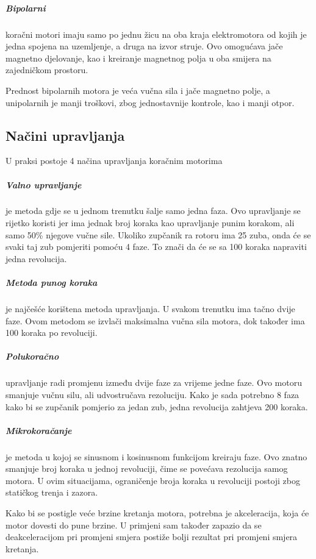 \documentclass[../Document.tex]{subfiles}
\begin{document}

\subparagraph{Bipolarni} \noindent koračni motori imaju samo po jednu žicu na oba kraja elektromotora od kojih je jedna spojena na uzemljenje, a druga na izvor struje. Ovo omogućava jače magnetno djelovanje, kao i kreiranje magnetnog polja u oba smijera na zajedničkom prostoru.\\


\noindent Prednost bipolarnih motora je veća vučna sila i jače magnetno polje, a unipolarnih je manji troškovi, zbog jednostavnije kontrole, kao i manji otpor.

\subsection{Načini upravljanja}
U praksi postoje 4 načina upravljanja koračnim motorima

\subparagraph{Valno upravljanje} je metoda gdje se u jednom trenutku šalje samo jedna faza. Ovo upravljanje se rijetko koristi jer ima jednak broj koraka kao upravljanje punim korakom, ali samo 50\% njegove vučne sile. Ukoliko zupčanik ra rotoru ima 25 zuba, onda će se svaki taj zub pomjeriti pomoću 4 faze. To znači da će se sa 100 koraka napraviti jedna revolucija.\\

\subparagraph{Metoda punog koraka} je najčešće korištena metoda upravljanja. U svakom trenutku ima tačno dvije faze. Ovom metodom se izvlači maksimalna vučna sila motora, dok također ima 100 koraka po revoluciji.\\


\subparagraph{Polukoračno} upravljanje radi promjenu između dvije faze za vrijeme jedne faze. Ovo motoru smanjuje vučnu silu, ali udvostručava rezoluciju. Kako je sada potrebno 8 faza kako bi se zupčanik pomjerio za jedan zub, jedna  revolucija zahtjeva 200 koraka.


\subparagraph{Mikrokoračanje} je metoda u kojoj se sinusnom i kosinusnom funkcijom kreiraju faze. Ovo znatno smanjuje broj koraka u jednoj revoluciji, čime se povećava rezolucija samog motora. U ovim situacijama, ograničenje broja koraka u revoluciji postoji zbog statičkog trenja i zazora.

\noindent Kako bi se postigle veće brzine kretanja motora, potrebna je akceleracija, koja će motor dovesti do pune brzine. U primjeni sam također zapazio da se deakceleracijom pri promjeni smjera postiže bolji rezultat pri promjeni smjera kretanja.
\end{document}
